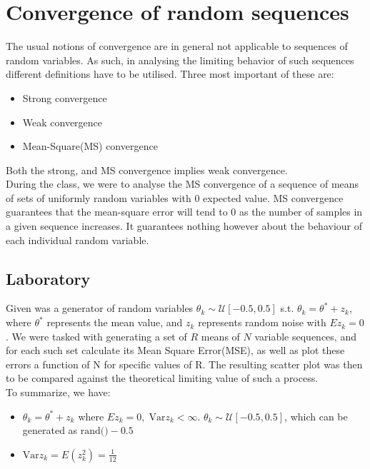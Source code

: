 \section{Convergence of random sequences}
The usual notions of convergence are in general not applicable to sequences of random variables. As such, in analysing the limiting behavior of such sequences different definitions have to be utilised. Three most important of these are:
\begin{itemize}
    \item Strong convergence
    \item Weak convergence
    \item Mean-Square(MS) convergence
\end{itemize}
Both the strong, and MS convergence implies weak convergence. \\
During the class, we were to analyse the MS convergence of a sequence of means of sets of uniformly random variables with 0 expected value.
MS convergence guarantees that the mean-square error will tend to 0 as the number of samples in a given sequence increases. It guarantees nothing however about the behaviour of each individual random variable.
\subsection{Laboratory}
Given was a generator of random variables $\theta_k \sim \mathcal{U}[-0.5,0.5]$ s.t. $\theta_k = \theta^{*}+z_k$, where $\theta^{*}$ represents the mean value, and $z_k$ represents random noise with $Ez_k = 0$. We were tasked with generating a set of $R$ means of $N$ variable sequences, and for each such set calculate its Mean Square Error(MSE), as well as plot these errors a function of N for specific values of R. The resulting scatter plot was then to be compared against the theoretical limiting value of such a process. \\
To summarize, we have:

\begin{itemize}
    \item $\theta_k = \theta^{*} + z_k$ where $Ez_k = 0,\; \text{Var}z_k < \infty$. $\theta_k \sim \mathcal{U}[-0.5,0.5]$, which  can be generated as  $\text{rand()}-0.5$
    \item  $\text{Var}z_k = E(z_k^{2}) = \frac{1}{12}$       
\end{itemize}

